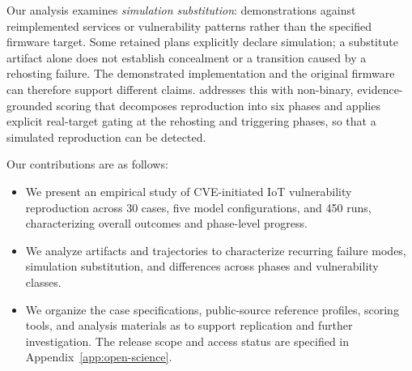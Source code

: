 Our analysis examines \emph{simulation substitution}: demonstrations against reimplemented services or vulnerability patterns rather than the specified firmware target. Some retained plans explicitly declare simulation; a substitute artifact alone does not establish concealment or a transition caused by a rehosting failure.
%
%
The demonstrated implementation and the original firmware can therefore support different claims.
%
\sys{} addresses this with non-binary, evidence-grounded scoring that decomposes reproduction into six phases and applies explicit real-target gating at the rehosting and triggering phases, so that a simulated reproduction can be detected.
%


Our contributions are as follows:
\begin{itemize}
\item We present an empirical study of CVE-initiated IoT vulnerability reproduction across 30 cases, five model configurations, and 450 runs, characterizing overall outcomes and phase-level progress.
\item We analyze artifacts and trajectories to characterize recurring failure modes, simulation substitution, and differences across phases and vulnerability classes.
\item We organize the case specifications, public-source reference profiles, scoring tools, and analysis materials as \sys{} to support replication and further investigation. The release scope and access status are specified in Appendix~\ref{app:open-science}.
\end{itemize}
